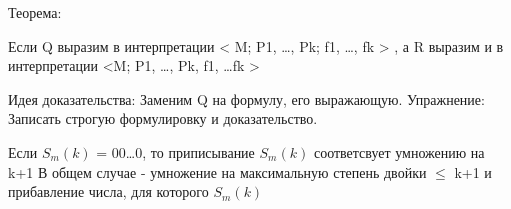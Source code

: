 



Теорема:

  Если Q выразим в интерпретации < M; P1, \ldots , Pk; f1, \ldots , fk > ,
  а R выразим и в интерпретации <M; P1, \ldots, Pk, f1, \ldots fk >
  
  Идея доказательства: Заменим Q на формулу, его выражающую.
  Упражнение: Записать строгую формулировку и доказательство.

Если ${S_m(k)}$ = 00\ldots 0, то приписывание ${S_m(k)}$ соответсвует умножению на k+1
В общем случае - умножение на максимальную степень двойки ${\leq}$ k+1 и прибавление числа, для которого ${S_m(k)}$


